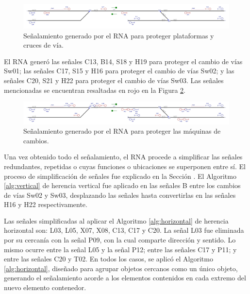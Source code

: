 	\begin{figure}[H]
		\centering
		\includegraphics[width=1\textwidth]{resultados-obtenidos/ejemplo2/images/2_step3.png}
		\centering\caption{Señalamiento generado por el RNA para proteger plataformas y cruces de vía.}
		\label{fig:EJ2_5}
	\end{figure}

	El RNA generó las señales C13, B14, S18 y H19 para proteger el cambio de vías Sw01; las señales C17, S15 y H16 para proteger el cambio de vías Sw02; y las señales C20, S21 y H22 para proteger el cambio de vías Sw03. Las señales mencionadas se encuentran resaltadas en rojo en la Figura \ref{fig:EJ2_6}.

	 \begin{figure}[H]
		\centering
		\includegraphics[width=1\textwidth]{resultados-obtenidos/ejemplo2/images/2_step4.png}
		\centering\caption{Señalamiento generado por el RNA para proteger las máquinas de cambios.}
		\label{fig:EJ2_6}
	\end{figure}

	Una vez obtenido todo el señalamiento, el RNA procede a simplificar las señales redundantes, repetidas o cuyas funciones o ubicaciones se superponen entre sí. El proceso de simplificación de señales fue explicado en la Sección \label{sec:simplificacion}. El Algoritmo \ref{alg:vertical} de herencia vertical fue aplicado en las señales B entre los cambios de vías Sw02 y Sw03, desplazando las señales hasta convertirlas en las señales H16 y H22 respectivamente.
	
	Las señales simplificadas al aplicar el Algoritmo \ref{alg:horizontal} de herencia horizontal son: L03, L05, X07, X08, C13, C17 y C20. La señal L03 fue eliminada por su cercanía con la señal P09, con la cual comparte dirección y sentido. Lo mismo ocurre entre la señal L05 y la señal P12; entre las señales C17 y P11; y entre las señales C20 y T02. En todos los casos, se aplicó el Algoritmo \ref{alg:horizontal}, diseñado para agrupar objetos cercanos como un único objeto, generando el señalamiento acorde a los elementos contenidos en cada extremo del nuevo elemento contenedor.
	
